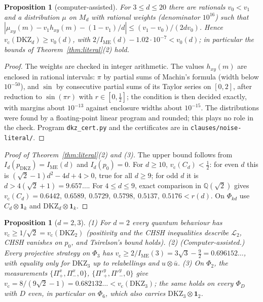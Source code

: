 \documentclass[11pt]{amsart}
\newtheorem{proposition}[theorem]{Proposition}
\theoremstyle{definition}
\theoremstyle{remark}
\numberwithin{equation}{section}
\newcommand{\one}{\mathbf{1}}
\newcommand{\IME}{I_{\mathrm{ME}}}
\newcommand{\Q}{\mathbb{Q}}
\newcommand{\cL}{\mathcal{L}}
\newcommand{\vc}{v_{\mathrm c}}
\newcommand{\DKZ}{\mathrm{DKZ}}
\begin{document}
\begin{proposition}[computer-assisted]\label{prop:dkzcert}
For $3\le d\le20$ there are rationals $v_0<v_1$ and a distribution $\mu$ on $M_d$ with rational weights (denominator
$10^{16}$) such that $|\mu_{xy}(m)-v_1h_{xy}(m)-(1-v_1)/d|\le(v_1-v_0)/(2dv_0)$. Hence $\vc(\DKZ_d)\ge v_0(d)$, with
$2/\IME(d)-1.02\cdot10^{-7}<v_0(d)$; in particular the bounds of Theorem~\ref{thm:literal}(2) hold.
\end{proposition}

\begin{proof}
The weights are checked in integer arithmetic. The values $h_{xy}(m)$ are enclosed in rational intervals: $\pi$ by
partial sums of Machin's formula (width below $10^{-50}$), and $\sin$ by consecutive partial sums of its Taylor series
on $[0,2]$, after reduction to $\sin(\pi r)$ with $r\in[0,\frac12]$; the condition is then decided exactly, with margins
about $10^{-13}$ against enclosure widths about $10^{-15}$. The distributions were found by a floating-point linear
program\cite{HiGHS} and rounded; this plays no role in the check. Program \texttt{dkz\_cert.py} and the certificates are
in \texttt{clauses/noise-literal/}.
\end{proof}

\begin{proof}[Proof of Theorem~\ref{thm:literal}(2) and (3)]
The upper bound follows from $I_d(p_{\DKZ})=\IME(d)$ and $I_d(p_0)=0$. For $d\ge10$, $\vc(C_d)<\frac12$: for even $d$
this is $(\sqrt2-1)d^2-4d+4>0$, true for all $d\ge9$; for odd $d$ it is $d>4(\sqrt2+1)=9.657\ldots$. For $4\le d\le9$,
exact comparison in $\Q(\sqrt2)$ gives $\vc(C_d)=0.6442,\ 0.6589,\ 0.5729,\ 0.5798,\ 0.5137,\ 0.5176<r(d)$. On
$\Phi_{kd}$ use $C_d\otimes\one_k$ and $\DKZ_d\otimes\one_k$.
\end{proof}

\begin{proposition}[$d=2,3$]\label{prop:small}
(1) For $d=2$ every quantum behaviour has $\vc\ge1/\sqrt2=\vc(\DKZ_2)$ (positivity and the CHSH inequalities describe
$\cL_2$\cite{Fine}, CHSH vanishes on $p_0$, and Tsirelson's bound\cite{Tsirelson} holds). (2) (Computer-assisted.) Every
projective strategy on $\Phi_3$ has $\vc\ge2/\IME(3)=3\sqrt3-\frac92=0.696152\ldots$, with equality only for $\DKZ_3$ up
to relabellings and $u\otimes\bar u$. (3) On $\Phi_2$, the measurements $\{\Pi^x_+,\Pi^x_-,0\}$, $\{\Pi'^y_+,\Pi'^y_-,0\}$
give $\vc=8/(9\sqrt2-1)=0.682132\ldots<\vc(\DKZ_3)$; the same holds on every $\Phi_D$ with $D$ even, in particular on
$\Phi_6$, which also carries $\DKZ_3\otimes\one_2$.
\end{proposition}
\end{document}

